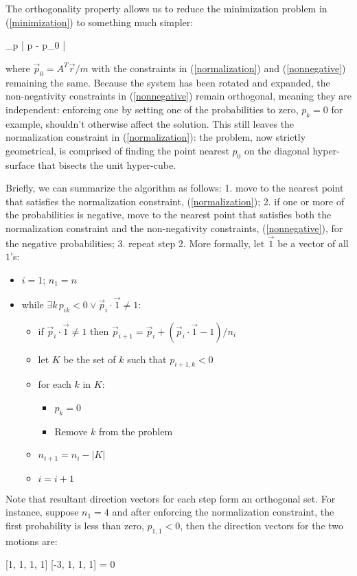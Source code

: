 The orthogonality property allows us to reduce the minimization problem 
in (\ref{minimization}) to something much simpler:
\begin{eqnnon}
	\arg \min_{\vec p} | \vec p - \vec p_0 |
\end{eqnnon}
where $\vec p_0 = A^T \vec r/m$ with the constraints in (\ref{normalization}) and
(\ref{nonnegative}) remaining the same.
Because the system has been rotated and expanded, the non-negativity 
constraints in (\ref{nonnegative}) remain orthogonal, meaning they are 
independent: enforcing one by setting one of the probabilities to zero, 
$p_k=0$ for example, shouldn't otherwise affect the solution.
This still leaves the normalization constraint in (\ref{normalization}):
the problem, now strictly geometrical, is comprised of finding the point nearest $p_0$ on the diagonal hyper-surface that bisects the unit hyper-cube.

Briefly, we can summarize the algorithm as follows:
1. move to the nearest point that satisfies the normalization constraint,
(\ref{normalization}); 2. if one or more of the probabilities is negative,
move to the nearest point that satisfies both 
the normalization constraint
and the non-negativity constraints, (\ref{nonnegative}), for the negative probabilities;
3. repeat step 2.
More formally, let $\vec 1$ be a vector of all $1$'s:
\begin{itemize}
	\item $i=1$; $n_1=n$
	\item while $\exists k \, p_{ik} < 0 \lor \vec p_i \cdot \vec 1 \ne 1$:
	\begin{itemize}
		\item if $\vec p_i \cdot \vec 1 \ne 1$ then 
		$\vec p_{i+1} = \vec p_i + (\vec p_i \cdot \vec 1 - 1)/n_i$
		\item let $K$ be the set of $k$ such that $p_{i+1,k} < 0$
		\item for each $k$ in $K$:
		\begin{itemize}
			\item $p_k=0$
			\item Remove $k$ from the problem
		\end{itemize}
		\item $n_{i+1}=n_i-|K|$
		\item $i=i+1$
	\end{itemize}
\end{itemize}

Note that resultant direction vectors for each step form an orthogonal set.
For instance, suppose $n_1=4$ and after enforcing the normalization constraint,
the first probability is less than zero, $p_{1,1} < 0$,
then the direction vectors for the two motions are:
\begin{eqnnon}
	[1, 1, 1, 1] \cdot {} [-3, 1, 1, 1] = 0
\end{eqnnon}


